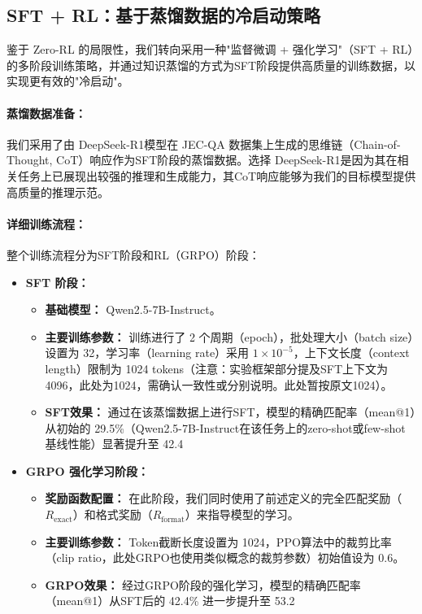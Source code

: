 \documentclass{article}
\newcommand{\qwen}{Qwen2.5-7B-Instruct}
\newcommand{\deepseekr}{DeepSeek-R1}
\newcommand{\qwen}{Qwen2.5-7B-Instruct}
\newcommand{\deepseekr}{DeepSeek-R1}
\begin{document}
\subsection{SFT + RL：基于蒸馏数据的冷启动策略}
鉴于 Zero-RL 的局限性，我们转向采用一种"监督微调 + 强化学习"（SFT + RL）的多阶段训练策略，并通过知识蒸馏的方式为SFT阶段提供高质量的训练数据，以实现更有效的"冷启动"。

\paragraph{蒸馏数据准备：}
我们采用了由 \deepseekr 模型在 JEC-QA 数据集上生成的思维链（Chain-of-Thought, CoT）响应作为SFT阶段的蒸馏数据。选择 \deepseekr 是因为其在相关任务上已展现出较强的推理和生成能力，其CoT响应能够为我们的目标模型提供高质量的推理示范。

\paragraph{详细训练流程：}
整个训练流程分为SFT阶段和RL（GRPO）阶段：
\begin{itemize}
    \item \textbf{SFT 阶段：}
    \begin{itemize}
        \item \textbf{基础模型：} \qwen。
        \item \textbf{主要训练参数：} 训练进行了 2 个周期（epoch），批处理大小（batch size）设置为 32，学习率（learning rate）采用 $1 \times 10^{-5}$，上下文长度（context length）限制为 1024 tokens（注意：实验框架部分提及SFT上下文为4096，此处为1024，需确认一致性或分别说明。此处暂按原文1024）。
        \item \textbf{SFT效果：} 通过在该蒸馏数据上进行SFT，模型的精确匹配率（mean@1）从初始的 29.5\%（\qwen 在该任务上的zero-shot或few-shot基线性能）显著提升至 42.4%
    \end{itemize}
    \item \textbf{GRPO 强化学习阶段：}
    \begin{itemize}
        \item \textbf{奖励函数配置：} 在此阶段，我们同时使用了前述定义的完全匹配奖励（$R_{\mathrm{exact}}$）和格式奖励（$R_{\mathrm{format}}$）来指导模型的学习。
        \item \textbf{主要训练参数：} Token截断长度设置为 1024，PPO算法中的裁剪比率（clip ratio，此处GRPO也使用类似概念的裁剪参数）初始值设为 0.6。
        \item \textbf{GRPO效果：} 经过GRPO阶段的强化学习，模型的精确匹配率（mean@1）从SFT后的 42.4\% 进一步提升至 53.2%
    \end{itemize}
\end{itemize}
\end{document}
